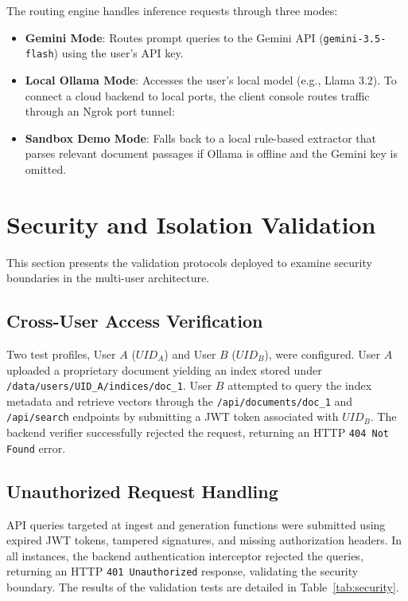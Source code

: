 \documentclass[11pt,journal,onecolumn]{article}
\begin{document}
The routing engine handles inference requests through three modes:
\begin{itemize}
    \item \textbf{Gemini Mode}: Routes prompt queries to the Gemini API (\texttt{gemini-3.5-flash}) using the user's API key.
    \item \textbf{Local Ollama Mode}: Accesses the user's local model (e.g., Llama 3.2). To connect a cloud backend to local ports, the client console routes traffic through an Ngrok port tunnel:
    \begin{equation{}}
           
    \end{equation{}}
    \item \textbf{Sandbox Demo Mode}: Falls back to a local rule-based extractor that parses relevant document passages if Ollama is offline and the Gemini key is omitted.
\end{itemize}

\section{Security and Isolation Validation}
This section presents the validation protocols deployed to examine security boundaries in the multi-user architecture.

\subsection{Cross-User Access Verification}
Two test profiles, User $A$ ($UID_A$) and User $B$ ($UID_B$), were configured. User $A$ uploaded a proprietary document yielding an index stored under \texttt{/data/users/UID\_A/indices/doc\_1}. User $B$ attempted to query the index metadata and retrieve vectors through the \texttt{/api/documents/doc\_1} and \texttt{/api/search} endpoints by submitting a JWT token associated with $UID_B$. The backend verifier successfully rejected the request, returning an HTTP \texttt{404 Not Found} error.

\subsection{Unauthorized Request Handling}
API queries targeted at ingest and generation functions were submitted using expired JWT tokens, tampered signatures, and missing authorization headers. In all instances, the backend authentication interceptor rejected the queries, returning an HTTP \texttt{401 Unauthorized} response, validating the security boundary. The results of the validation tests are detailed in Table~\ref{tab:security}.
\end{document}
